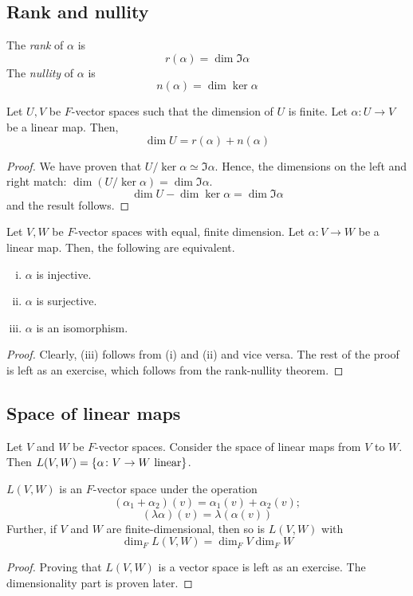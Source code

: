 \subsection{Rank and nullity}
\begin{definition}
	The \textit{rank} of \( \alpha \) is
	\[
		r(\alpha) = \dim\Im \alpha
	\]
	The \textit{nullity} of \( \alpha \) is
	\[
		n(\alpha) = \dim\ker \alpha
	\]
\end{definition}
\begin{theorem}
	Let \( U, V \) be \( F \)-vector spaces such that the dimension of \( U \) is finite.
	Let \( \alpha \colon U \to V \) be a linear map.
	Then,
	\[
		\dim U = r(\alpha) + n(\alpha)
	\]
\end{theorem}
\begin{proof}
	We have proven that \( U / \ker \alpha \simeq \Im \alpha \).
	Hence, the dimensions on the left and right match: \( \dim (U/\ker\alpha) = \dim \Im \alpha \).
	\[
		\dim U - \dim \ker \alpha = \dim \Im \alpha
	\]
	and the result follows.
\end{proof}
\begin{lemma}
	Let \( V, W \) be \( F \)-vector spaces with equal, finite dimension.
	Let \( \alpha \colon V \to W \) be a linear map.
	Then, the following are equivalent.
	\begin{enumerate}[(i)]
		\item \( \alpha \) is injective.
		\item \( \alpha \) is surjective.
		\item \( \alpha \) is an isomorphism.
	\end{enumerate}
\end{lemma}
\begin{proof}
	Clearly, (iii) follows from (i) and (ii) and vice versa.
	The rest of the proof is left as an exercise, which follows from the rank-nullity theorem.
\end{proof}

\subsection{Space of linear maps}
Let \( V \) and \( W \) be \( F \)-vector spaces.
Consider the space of linear maps from \( V \) to \( W \).
Then \( L(V,W) = \qty{\alpha \colon V \to W \text{ linear}} \).
\begin{proposition}
	\( L(V,W) \) is an \( F \)-vector space under the operation
	\[
		(\alpha_1 + \alpha_2)(v) = \alpha_1(v) + \alpha_2(v);
	\]
	\[
		(\lambda \alpha)(v) = \lambda( \alpha(v) )
	\]
	Further, if \( V \) and \( W \) are finite-dimensional, then so is \( L(V,W) \) with
	\[
		\dim_F L(V,W) = \dim_F V \dim_F W
	\]
\end{proposition}
\begin{proof}
	Proving that \( L(V,W) \) is a vector space is left as an exercise.
	The dimensionality part is proven later.
\end{proof}

